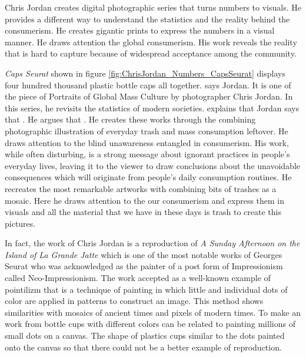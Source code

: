 Chris Jordan creates digital photographic series that turns numbers to visuals. He provides a different way to understand the statistics and the reality behind the consumerism. He creates gigantic prints to express the numbers in a visual manner. He draws attention the global consumerism. His work reveals the reality that is hard to capture because of widespread acceptance among the community.

\textit{Caps Seurat} shown in figure \ref{fig:ChrisJordan_Numbers_CapsSeurat} displays four hundred thousand plastic bottle caps all together.  says Jordan. It is one of the piece of Portraits of Global Mass Culture by photographer Chris Jordan. In this series, he revisits the statistics of modern societies. \cite{boustead2015impossible} explains that  Jordan says that  \citep[as cite in][]{boustead2015impossible}. He argues that  \citep[as cite in][]{boustead2015impossible}. He creates these works through the combining photographic illustration of everyday trash and mass consumption leftover. He draws attention to the blind unawareness entangled in consumerism. His work, while often disturbing, is a strong message about ignorant practices in people’s everyday lives, leaving it to the viewer to draw conclusions about the unavoidable consequences which will originate from people’s daily consumption routines. He recreates the most remarkable artworks with combining bits of trashes as a mosaic. Here he draws attention to the our consumerism and express them in visuals and all the material that we have in these days is trash to create this pictures.

In fact, the work of Chris Jordan is a reproduction of \textit{A Sunday Afternoon on the Island of La Grande Jatte} which is one of the most notable works of Georges Seurat who was acknowledged as the painter of a post form of Impressionism called Neo-Impressionism. The work accepted as a well-known example of pointilizm that is a technique of painting in which little and individual dots of color are applied in patterns to construct an image. This method shows similarities with mosaics of ancient times and pixels of modern times. To make an work from bottle cups with different colors can be related to painting millions of small dots on a canvas. The shape of plastics cups similar to the dots painted onto the canvas so that there could not be a better example of reproduction.

